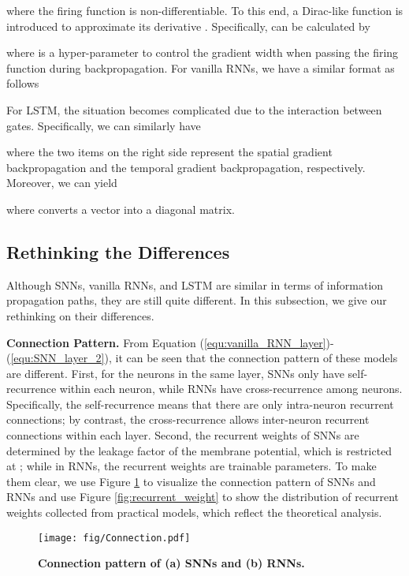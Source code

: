 \documentclass[journal,10pt,twocolumn]{IEEETran}
\begin{document}
where the firing function is non-differentiable. To this end, a Dirac-like function is introduced to approximate its derivative \cite{wu2018spatio}. Specifically,  can be calculated by

where  is a hyper-parameter to control the gradient width when passing the firing function during backpropagation. For vanilla RNNs, we have a similar format as follows

For LSTM, the situation becomes complicated due to the interaction between gates. Specifically, we can similarly have

where the two items on the right side represent the spatial gradient backpropagation and the temporal gradient backpropagation, respectively. Moreover, we can yield

where  converts a vector into a diagonal matrix.

\subsection{Rethinking the Differences}

Although SNNs, vanilla RNNs, and LSTM are similar in terms of information propagation paths, they are still quite different. In this subsection, we give our rethinking on their differences.

\textbf{Connection Pattern.} From Equation (\ref{equ:vanilla_RNN_layer})-(\ref{equ:SNN_layer_2}), it can be seen that the connection pattern of these models are different. First, for the neurons in the same layer, SNNs only have self-recurrence within each neuron, while RNNs have cross-recurrence among neurons. Specifically, the self-recurrence means that there are only intra-neuron recurrent connections; by contrast, the cross-recurrence allows inter-neuron recurrent connections within each layer. Second, the recurrent weights of SNNs are determined by the leakage factor of the membrane potential, which is restricted at ; while in RNNs, the recurrent weights are trainable parameters. To make them clear, we use Figure \ref{fig:connection} to visualize the connection pattern of SNNs and RNNs and use Figure \ref{fig:recurrent_weight} to show the distribution of recurrent weights collected from practical models, which reflect the theoretical analysis.

\begin{figure}[!htbp]
\centering     
\texttt{[image: fig/Connection.pdf]}
\flushleft
\caption{\textbf{Connection pattern of (a) SNNs and (b) RNNs.}} \label{fig:connection} 
\end{figure}
\end{document}
